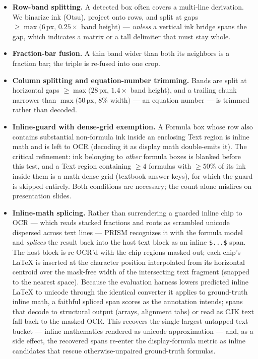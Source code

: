 \begin{itemize}
\item \textbf{Row-band splitting.} A detected box often covers a multi-line derivation. We binarize ink (Otsu), project onto rows, and split at gaps $\geq \max(6\,\mathrm{px},\, 0.25\times$ band height$)$ --- \emph{unless} a vertical ink bridge spans the gap, which indicates a matrix or a tall delimiter that must stay whole.
\item \textbf{Fraction-bar fusion.} A thin band wider than both its neighbors is a fraction bar; the triple is re-fused into one crop.
\item \textbf{Column splitting and equation-number trimming.} Bands are split at horizontal gaps $\geq \max(28\,\mathrm{px},\,1.4\times$ band height$)$, and a trailing chunk narrower than $\max(50\,\mathrm{px},\,8\%$ width$)$ --- an equation number --- is trimmed rather than decoded.
\item \textbf{Inline-guard with dense-grid exemption.} A Formula box whose row also contains substantial non-formula ink inside an enclosing Text region is inline math and is left to OCR (decoding it as display math double-emits it). The critical refinement: ink belonging to \emph{other} formula boxes is blanked before this test, and a Text region containing $\geq 4$ formulas with $\geq 50$\% of its ink inside them is a math-dense grid (textbook answer keys), for which the guard is skipped entirely. Both conditions are necessary; the count alone misfires on presentation slides.
\item \textbf{Inline-math splicing.} Rather than surrendering a guarded inline chip to OCR --- which reads stacked fractions and roots as scrambled unicode dispersed across text lines --- PRISM recognizes it with the formula model and \emph{splices} the result back into the host text block as an inline \verb|$...$| span. The host block is re-OCR'd with the chip regions masked out; each chip's \LaTeX{} is inserted at the character position interpolated from its horizontal centroid over the mask-free width of the intersecting text fragment (snapped to the nearest space). Because the evaluation harness lowers predicted inline \LaTeX{} to unicode through the identical converter it applies to ground-truth inline math, a faithful spliced span scores as the annotation intends; spans that decode to structural output (arrays, alignment tabs) or read as CJK text fall back to the masked OCR. This recovers the single largest untapped text bucket --- inline mathematics rendered as unicode approximation --- and, as a side effect, the recovered spans re-enter the display-formula metric as inline candidates that rescue otherwise-unpaired ground-truth formulas.

\end{itemize}
